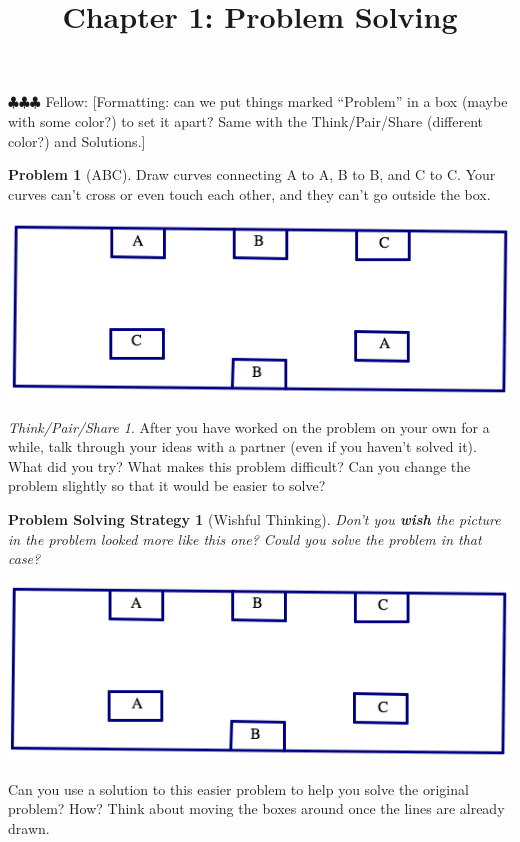 \documentclass[10pt, reqno]{amsart}
\title{Chapter 1: Problem Solving}
\newtheorem{ps}{Problem Solving Strategy}
\theoremstyle{remark}
\newtheorem*{thinkpair*}{Think/Pair/Share}
\theoremstyle{definition}
\newtheorem{problem}{Problem}
\numberwithin{equation}{section}  %
\newcommand{\fellow}[1]{{\color{magenta} \sf $\clubsuit\clubsuit\clubsuit$ Fellow: [#1]}}
\begin{document}
\maketitle

\fellow{Formatting: can we put things marked ``Problem'' in a box (maybe with some color?) to set it apart?  Same with the Think/Pair/Share (different color?) and Solutions.}

\begin{problem}[ABC]
Draw curves connecting A to A, B to B, and C to C.  Your curves can't cross or even touch each other, and they can't go outside the box.
\begin{center}
\includegraphics[height=4 cm]{prob1_pic1}
\end{center}
\end{problem}


\begin{thinkpair*}
After you have worked on the problem on your own for a while, talk through your ideas with a partner (even if you haven't solved it).  What did you try?   What makes this problem difficult?  Can you change the problem slightly so that it would be easier to solve?
\end{thinkpair*}

\begin{ps}[Wishful Thinking]
Don't you \emph{\bf wish} the picture in the problem looked more like this one?  Could you solve the problem in that case?
\begin{center}
\includegraphics[height=4 cm]{prob1_pic2}
\end{center}
\end{ps}

Can you use a solution to this easier problem to help you solve the original problem?  How?  Think about moving the boxes around once the lines are already drawn.
\end{document}
